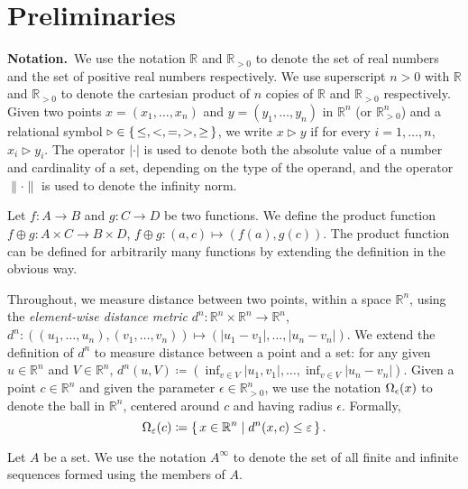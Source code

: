 
\section{Preliminaries}

\smallskip
\noindent\textbf{Notation.}\
We use the notation $\mathbb{R}$ and $\mathbb{R}_{>0}$ to denote the set of real numbers and the set of positive real numbers respectively.
We use superscript $n>0$ with $\mathbb{R}$ and $\mathbb{R}_{>0}$ to denote the cartesian product of $n$ copies of $\mathbb{R}$ and $\mathbb{R}_{>0}$ respectively.
Given two points $x=(x_1,\ldots, x_n)$ and $y=(y_1,\ldots, y_n)$ in $ \mathbb{R}^n$ (or $\mathbb{R}^n_{>0}$) and a relational symbol $\triangleright\in \set{\leq, <, = , >, \geq}$, we write $x\triangleright y$ if for every $i=1,\ldots,n$, $x_i\triangleright y_i$.
The operator $|\cdot |$ is used to denote both the absolute value of a number and cardinality of a set, depending on the type of the operand, and the operator $\| \cdot \|$ is used to denote the infinity norm.  

Let $f\colon A\to B$ and $g\colon C\to D$ be two functions.
We define the product function $f\oplus g\colon A\times C\to B\times D $, $f\oplus g \colon (a,c)\mapsto (f(a),g(c))$.
The product function can be defined for arbitrarily many functions by extending the definition in the obvious way.

Throughout, we measure distance between two points, within a space $\mathbb{R}^n$, using the \emph{element-wise distance metric} $d^n\colon \mathbb{R}^n\times \mathbb{R}^n\to \mathbb{R}^n$, $d^n\colon \left((u_1,\ldots, u_n),(v_1,\ldots,v_n)\right)\mapsto \left(|u_1-v_1|,\ldots,|u_n-v_n|\right)$. 
We extend the definition of $d^n$ to measure distance between a point and a set: for any given $u\in \mathbb{R}^n$ and $V\in \mathbb{R}^n$, $d^n(u,V) \coloneqq \left( \inf_{v\in V}|u_1,v_1|,\ldots, \inf_{v\in V}|u_n-v_n| \right)$.
Given a point $c\in \mathbb{R}^n$ and given the parameter $\epsilon\in \mathbb{R}_{>0}^{n}$, we use the notation $\Omega_\epsilon( x)$ to denote the ball in $\mathbb{R}^n$, centered around $c$ and having radius $\epsilon$.
Formally, \[\Omega_\varepsilon(c)\coloneqq \set{x
	\in \mathbb{R}^n \mid  d^n(x,c)\leq \varepsilon }.\] 

Let $A$ be a set.
We use the notation $A^\infty$ to denote the set of all finite and infinite sequences formed using the members of $A$.


